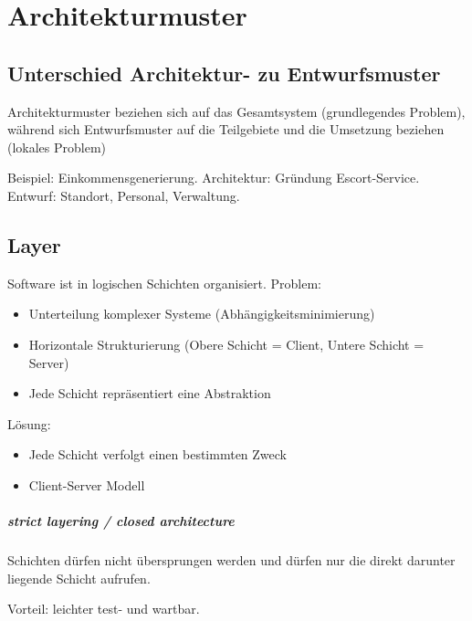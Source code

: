 \chapter{Architekturmuster}\label{architekturmuster}

\section{Unterschied Architektur- zu
Entwurfsmuster}\label{unterschied-architektur--zu-entwurfsmuster}

Architekturmuster beziehen sich auf das Gesamtsystem (grundlegendes
Problem), während sich Entwurfsmuster auf die Teilgebiete und die
Umsetzung beziehen (lokales Problem)

Beispiel: Einkommensgenerierung. Architektur: Gründung Escort-Service.
Entwurf: Standort, Personal, Verwaltung.

\section{Layer}\label{layer}

Software ist in logischen Schichten organisiert. Problem:

\begin{itemize}
\itemsep1pt\parskip0pt
\item
  Unterteilung komplexer Systeme (Abhängigkeitsminimierung)
\item
  Horizontale Strukturierung (Obere Schicht = Client, Untere Schicht =
  Server)
\item
  Jede Schicht repräsentiert eine Abstraktion
\end{itemize}

Lösung:

\begin{itemize}
\itemsep1pt\parskip0pt
\item
  Jede Schicht verfolgt einen bestimmten Zweck
\item
  Client-Server Modell
\end{itemize}

\paragraph{strict layering / closed
architecture}\label{strict-layering-closed-architecture}

Schichten dürfen nicht übersprungen werden und dürfen nur die direkt
darunter liegende Schicht aufrufen.

Vorteil: leichter test- und wartbar.

